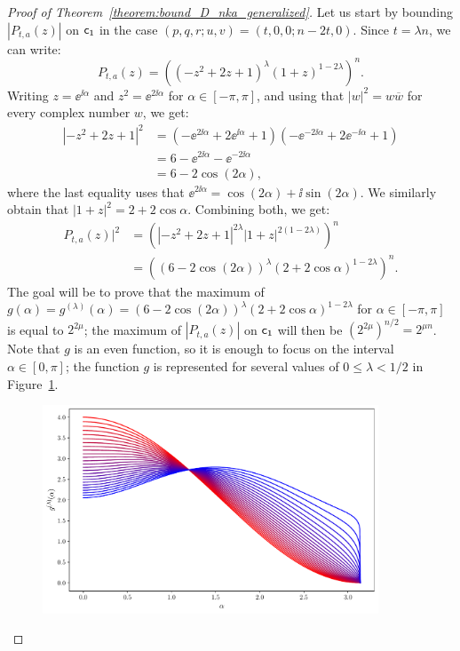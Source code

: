 \documentclass{llncs}
\begin{document}
\begin{proof}[Proof of Theorem~\ref{theorem:bound_D_nka_generalized}]
    Let us start by bounding $|P_{t,a}(z)|$ on $\mathsf{c_1}$ in the case $(p,q,r;u,v)=(t,0,0;n-2t,0)$. Since $t=\lambda n$, we can write:
    \[
        P_{t,a}(z)=\left((-z^2+2z+1)^{\lambda}(1+z)^{1-2\lambda}\right)^n.
    \]
    Writing $z=\ee^{\ii\alpha}$ and $z^2=\ee^{2\ii\alpha}$ for $\alpha\in[-\pi,\pi]$, and using that $|w|^2=w\overline w$ for every complex number $w$, we get:
    \begin{align*}
        |-z^2+2z+1|^2&=\left(-\ee^{2\ii\alpha}+2\ee^{\ii\alpha}+1\right)\left(-\ee^{-2\ii\alpha}+2\ee^{-\ii\alpha}+1\right)\\
        &=6-\ee^{2\ii\alpha}-\ee^{-2\ii\alpha}\\
        &=6-2\cos (2\alpha),
    \end{align*}
    where the last equality uses that $\ee^{2\ii\alpha}=\cos(2\alpha)+\ii\sin(2\alpha)$. We similarly obtain that $|1+z|^2=2+2\cos\alpha$. Combining both, we get:
	\begin{align*}
		P_{t,a}(z)|^2&=\left(\left|-z^2+2z+1\right|^{2\lambda}|1+z|^{2(1-2\lambda)}\right)^n\\
		&=\left((6-2\cos(2\alpha))^\lambda(2+2\cos\alpha)^{1-2\lambda}\right)^n.
	\end{align*}
    The goal will be to prove that the maximum of $g(\alpha)=g^{(\lambda)}(\alpha)=(6-2\cos(2\alpha))^\lambda(2+2\cos\alpha)^{1-2\lambda}$ for $\alpha\in[-\pi,\pi]$ is equal to $2^{2\mu}$; the maximum of $|P_{t,a}(z)|$ on $\mathsf{c_1}$ will then be $\left(2^{2\mu}\right)^{n/2}=2^{\mu n}$. Note that $g$ is an even function, so it is enough to focus on the interval $\alpha\in[0,\pi]$; the function $g$ is represented for several values of $0\leq\lambda<1/2$ in Figure~\ref{fig:family_curves_g}.

    \begin{figure}
    	\centering
    	\includegraphics[width=10cm]{family_curves_g.pdf}
        \vspace{-4mm}
    	\label{fig:family_curves_g}
    \end{figure}
    

\end{proof}
\end{document}

